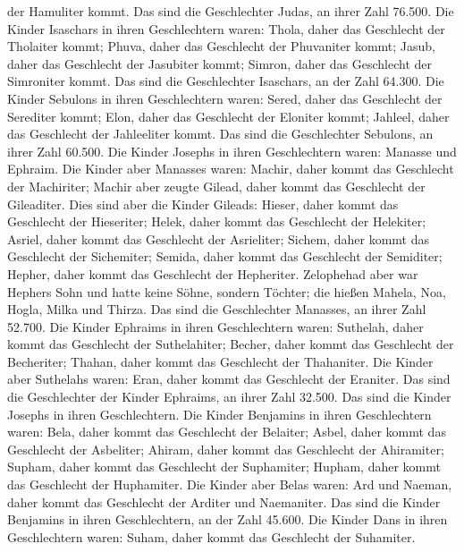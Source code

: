 der Hamuliter kommt.  Das sind die Geschlechter Judas, an
ihrer Zahl 76.500.  Die Kinder Isaschars in ihren
Geschlechtern waren: Thola, daher das Geschlecht der Tholaiter kommt;
Phuva, daher das Geschlecht der Phuvaniter kommt;  Jasub,
daher das Geschlecht der Jasubiter kommt; Simron, daher das Geschlecht
der Simroniter kommt.  Das sind die Geschlechter Isaschars,
an der Zahl 64.300.  Die Kinder Sebulons in ihren
Geschlechtern waren: Sered, daher das Geschlecht der Serediter kommt;
Elon, daher das Geschlecht der Eloniter kommt; Jahleel, daher das
Geschlecht der Jahleeliter kommt.  Das sind die
Geschlechter Sebulons, an ihrer Zahl 60.500.  Die Kinder
Josephs in ihren Geschlechtern waren: Manasse und Ephraim. 
Die Kinder aber Manasses waren: Machir, daher kommt das Geschlecht der
Machiriter; Machir aber zeugte Gilead, daher kommt das Geschlecht der
Gileaditer.  Dies sind aber die Kinder Gileads: Hieser,
daher kommt das Geschlecht der Hieseriter; Helek, daher kommt das
Geschlecht der Helekiter;  Asriel, daher kommt das
Geschlecht der Asrieliter; Sichem, daher kommt das Geschlecht der
Sichemiter;  Semida, daher kommt das Geschlecht der
Semiditer; Hepher, daher kommt das Geschlecht der Hepheriter.
 Zelophehad aber war Hephers Sohn und hatte keine Söhne,
sondern Töchter; die hießen Mahela, Noa, Hogla, Milka und Thirza.
 Das sind die Geschlechter Manasses, an ihrer Zahl 52.700.
 Die Kinder Ephraims in ihren Geschlechtern waren:
Suthelah, daher kommt das Geschlecht der Suthelahiter; Becher, daher
kommt das Geschlecht der Becheriter; Thahan, daher kommt das Geschlecht
der Thahaniter.  Die Kinder aber Suthelahs waren: Eran,
daher kommt das Geschlecht der Eraniter.  Das sind die
Geschlechter der Kinder Ephraims, an ihrer Zahl 32.500. Das sind die
Kinder Josephs in ihren Geschlechtern.  Die Kinder
Benjamins in ihren Geschlechtern waren: Bela, daher kommt das Geschlecht
der Belaiter; Asbel, daher kommt das Geschlecht der Asbeliter; Ahiram,
daher kommt das Geschlecht der Ahiramiter;  Supham, daher
kommt das Geschlecht der Suphamiter; Hupham, daher kommt das Geschlecht
der Huphamiter.  Die Kinder aber Belas waren: Ard und
Naeman, daher kommt das Geschlecht der Arditer und Naemaniter.
 Das sind die Kinder Benjamins in ihren Geschlechtern, an
der Zahl 45.600.  Die Kinder Dans in ihren Geschlechtern
waren: Suham, daher kommt das Geschlecht der Suhamiter. 
